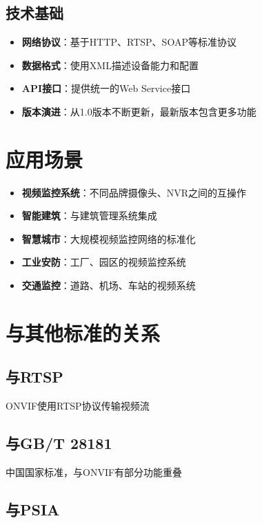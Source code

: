 \documentclass[12pt,UTF8]{ctexbook}
\begin{document}
\section{技术基础}

\begin{itemize}
  \item \textbf{网络协议}：基于HTTP、RTSP、SOAP等标准协议
  \item \textbf{数据格式}：使用XML描述设备能力和配置
  \item \textbf{API接口}：提供统一的Web Service接口
  \item \textbf{版本演进}：从1.0版本不断更新，最新版本包含更多功能
\end{itemize}

\chapter{应用场景}

\begin{itemize}
  \item \textbf{视频监控系统}：不同品牌摄像头、NVR之间的互操作
  \item \textbf{智能建筑}：与建筑管理系统集成
  \item \textbf{智慧城市}：大规模视频监控网络的标准化
  \item \textbf{工业安防}：工厂、园区的视频监控系统
  \item \textbf{交通监控}：道路、机场、车站的视频系统
\end{itemize}

\chapter{与其他标准的关系}

\section{与RTSP}

ONVIF使用RTSP协议传输视频流

\section{与GB/T 28181}

中国国家标准，与ONVIF有部分功能重叠

\section{与PSIA}
\end{document}
